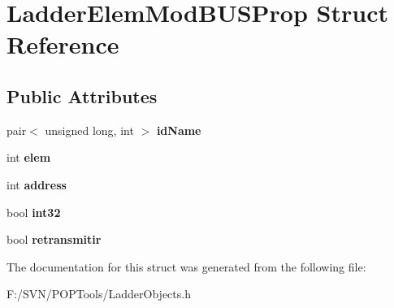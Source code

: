 \hypertarget{struct_ladder_elem_mod_b_u_s_prop}{\section{Ladder\-Elem\-Mod\-B\-U\-S\-Prop Struct Reference}
\label{struct_ladder_elem_mod_b_u_s_prop}
}
\subsection*{Public Attributes}
\begin{DoxyCompactItemize}
\item 
\hypertarget{struct_ladder_elem_mod_b_u_s_prop_a1c3098e19ba87eba059eaea5ec94ce87}{pair$<$ unsigned long, int $>$ {\bfseries id\-Name}}\label{struct_ladder_elem_mod_b_u_s_prop_a1c3098e19ba87eba059eaea5ec94ce87}

\item 
\hypertarget{struct_ladder_elem_mod_b_u_s_prop_aada611eb923ac9b1b4927aa39247c166}{int {\bfseries elem}}\label{struct_ladder_elem_mod_b_u_s_prop_aada611eb923ac9b1b4927aa39247c166}

\item 
\hypertarget{struct_ladder_elem_mod_b_u_s_prop_ab3d7393c3817dd2a4a0fc393e5fe2a73}{int {\bfseries address}}\label{struct_ladder_elem_mod_b_u_s_prop_ab3d7393c3817dd2a4a0fc393e5fe2a73}

\item 
\hypertarget{struct_ladder_elem_mod_b_u_s_prop_ae1eedaa952c12e599c491876060dba6b}{bool {\bfseries int32}}\label{struct_ladder_elem_mod_b_u_s_prop_ae1eedaa952c12e599c491876060dba6b}

\item 
\hypertarget{struct_ladder_elem_mod_b_u_s_prop_a8c2959d1b11706d1cecee340e87fa342}{bool {\bfseries retransmitir}}\label{struct_ladder_elem_mod_b_u_s_prop_a8c2959d1b11706d1cecee340e87fa342}

\end{DoxyCompactItemize}


The documentation for this struct was generated from the following file\-:\begin{DoxyCompactItemize}
\item 
F\-:/\-S\-V\-N/\-P\-O\-P\-Tools/Ladder\-Objects.\-h\end{DoxyCompactItemize}
